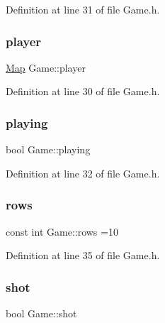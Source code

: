 Definition at line 31 of file Game.\+h.

\mbox{\label{class_game_a3be2e2f353ec3c6dbffff9f8557e7280}} 
\subsubsection{\texorpdfstring{player}{player}}
{\footnotesize\ttfamily \hyperlink{struct_map}{Map} Game\+::player\hspace{0.3cm}{\ttfamily [protected]}}



Definition at line 30 of file Game.\+h.

\mbox{\label{class_game_a42af2652c4ec21a2e6445fe866d01828}} 
\subsubsection{\texorpdfstring{playing}{playing}}
{\footnotesize\ttfamily bool Game\+::playing\hspace{0.3cm}{\ttfamily [protected]}}



Definition at line 32 of file Game.\+h.

\mbox{\label{class_game_ae882486dec6d9507bbef7f44aaf07db5}} 
\subsubsection{\texorpdfstring{rows}{rows}}
{\footnotesize\ttfamily const int Game\+::rows =10\hspace{0.3cm}{\ttfamily [protected]}}



Definition at line 35 of file Game.\+h.

\mbox{\label{class_game_aaf0b60de36091e3a4115004999e4dc7a}} 
\subsubsection{\texorpdfstring{shot}{shot}}
{\footnotesize\ttfamily bool Game\+::shot\hspace{0.3cm}{\ttfamily [protected]}}



